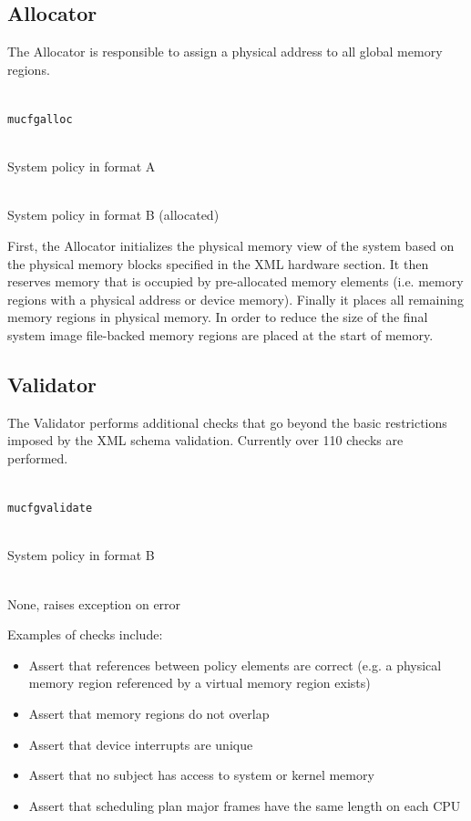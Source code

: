 \documentclass[a4paper,twoside,titlepage]{article}
\begin{document}
\subsection{Allocator}
\label{sec:tools-allocator}
The Allocator is responsible to assign a physical address to all global memory
regions.

\begin{description} \itemsep1pt \parskip0pt
	\item[Name] \hfill \\
		\texttt{mucfgalloc}
	\item[Input] \hfill \\
		System policy in format A
	\item[Output] \hfill \\
		System policy in format B (allocated)
\end{description}

First, the Allocator initializes the physical memory view of the system based
on the physical memory blocks specified in the XML hardware section. It then
reserves memory that is occupied by pre-allocated memory elements (i.e. memory
regions with a physical address or device memory).  Finally it places all
remaining memory regions in physical memory.  In order to reduce the size of
the final system image file-backed memory regions are placed at the start of
memory.

\subsection{Validator}
\label{sec:tools-validator}
The Validator performs additional checks that go beyond the basic restrictions
imposed by the XML schema validation. Currently over 110 checks are performed.

\begin{description} \itemsep1pt \parskip0pt
	\item[Name] \hfill \\
		\texttt{mucfgvalidate}
	\item[Input] \hfill \\
		System policy in format B
	\item[Output] \hfill \\
		None, raises exception on error
\end{description}

Examples of checks include:

\begin{itemize}
	\item Assert that references between policy elements are correct (e.g. a
		physical memory	region referenced by a virtual memory region exists)
	\item Assert that memory regions do not overlap
	\item Assert that device interrupts are unique
	\item Assert that no subject has access to system or kernel memory
	\item Assert that scheduling plan major frames have the same length on each
		CPU
\end{itemize}
\end{document}
